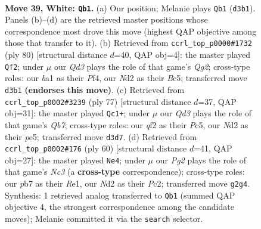 \documentclass[11pt]{article}
\begin{document}
\clearpage

\begin{figure}[p]\centering
\begin{subfigure}{0.46\textwidth}\centering
\resizebox{\linewidth}{!}{%
\newchessgame
\chessboard[
  setfen={2r3k1/1p3p2/6p1/p7/7p/3Q3P/P2NnqP1/b6K w - - 0 39},
  showmover=false,
  pgfstyle=straightmove, color=movearrow, markmove={d3-b1}
]}
\caption{}
\end{subfigure}\hfill
\begin{subfigure}{0.46\textwidth}\centering
\resizebox{\linewidth}{!}{%
\newchessgame
\chessboard[
  setfen={8/3bpk2/5p2/2Bp3q/5P2/1p1P4/1P1KP1Q1/8 w - - 6 41},
  showmover=false,
  pgfstyle=straightmove, color=movearrow, markmove={g2-f2}
]}
\caption{}
\end{subfigure}
\\[4pt]
\begin{subfigure}{0.46\textwidth}\centering
\resizebox{\linewidth}{!}{%
\newchessgame
\chessboard[
  setfen={5k2/4n2p/1p2Q3/p1p1P3/P7/2N4P/1q4P1/5K2 b - - 1 39},
  showmover=false,
  pgfstyle=straightmove, color=movearrow, markmove={b2-c1}
]}
\caption{}
\end{subfigure}\hfill
\begin{subfigure}{0.46\textwidth}\centering
\resizebox{\linewidth}{!}{%
\newchessgame
\chessboard[
  setfen={2r3k1/3p2p1/p7/2q4n/7Q/p1N4P/1PP3P1/4R2K w - - 0 31},
  showmover=false,
  pgfstyle=straightmove, color=movearrow, markmove={c3-e4}
]}
\caption{}
\end{subfigure}
\caption{\textbf{Move 39, White: \texttt{Qb1}.} (a) Our position; Melanie plays \texttt{Qb1} (\texttt{d3b1}). Panels (b)--(d) are the retrieved master positions whose correspondence most drove this move (highest QAP objective among those that transfer to it). (b) Retrieved from \texttt{ccrl\_top\_p0000\#1732} (ply 80) [structural distance $d$=40, QAP obj=4]: the master played \texttt{Qf2}; under $\mu$ our \emph{Qd3} plays the role of that game's \emph{Qg2}; cross-type roles: our \emph{b}a1 as their \emph{P}f4, our \emph{N}d2 as their \emph{B}c5; transferred move \texttt{d3b1} \textbf{(endorses this move)}. (c) Retrieved from \texttt{ccrl\_top\_p0002\#3239} (ply 77) [structural distance $d$=37, QAP obj=31]: the master played \texttt{Qc1+}; under $\mu$ our \emph{Qd3} plays the role of that game's \emph{Qb7}; cross-type roles: our \emph{q}f2 as their \emph{P}c5, our \emph{N}d2 as their \emph{p}e5; transferred move \texttt{d3d7}. (d) Retrieved from \texttt{ccrl\_top\_p0002\#176} (ply 60) [structural distance $d$=41, QAP obj=27]: the master played \texttt{Ne4}; under $\mu$ our \emph{Pg2} plays the role of that game's \emph{Nc3} (a \textbf{cross-type} correspondence); cross-type roles: our \emph{p}b7 as their \emph{R}e1, our \emph{N}d2 as their \emph{P}c2; transferred move \texttt{g2g4}. Synthesis: 1 retrieved analog transferred to \texttt{Qb1} (summed QAP objective 4, the strongest correspondence among the candidate moves); Melanie committed it via the \texttt{search} selector.}
\label{fig:thought-m76}
\end{figure}
\end{document}
